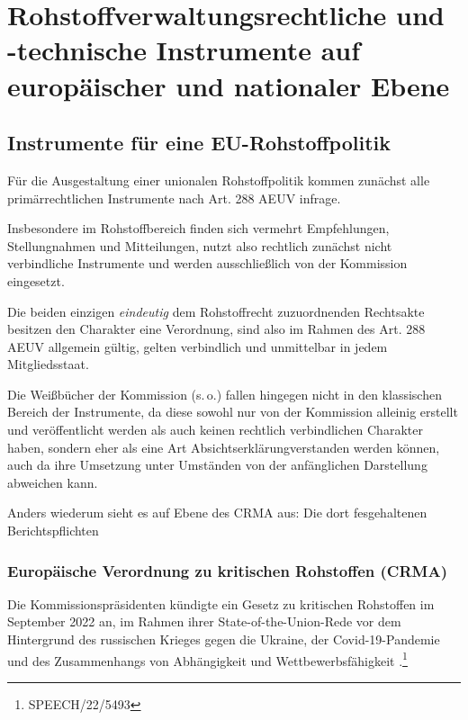 \documentclass[12pt,a4paper,oneside]{book} %
\begin{document}

\chapter{Rohstoffverwaltungsrechtliche und -technische Instrumente auf europäischer und nationaler Ebene}

\section{Instrumente für eine EU-Rohstoffpolitik}
Für die Ausgestaltung einer unionalen Rohstoffpolitik kommen zunächst alle primärrechtlichen Instrumente nach Art. 288 AEUV infrage.

Insbesondere im Rohstoffbereich finden sich vermehrt Empfehlungen, Stellungnahmen und Mitteilungen, nutzt also rechtlich zunächst nicht verbindliche Instrumente und werden ausschließlich von der Kommission eingesetzt.

Die beiden einzigen \textit{eindeutig} dem Rohstoffrecht zuzuordnenden Rechtsakte besitzen den Charakter eine Verordnung, sind also im Rahmen des Art. 288 AEUV allgemein gültig, gelten verbindlich und unmittelbar in jedem Mitgliedsstaat. 



Die Weißbücher der Kommission (s.\,o.) fallen hingegen nicht in den klassischen Bereich der Instrumente, da diese sowohl nur von der Kommission alleinig erstellt und veröffentlicht werden als auch keinen rechtlich verbindlichen Charakter haben, sondern eher als eine Art \glqq Absichtserklärung\grqq verstanden werden können, auch da ihre Umsetzung unter Umständen von der anfänglichen Darstellung abweichen kann.\autocite[siehe hierzu]{Dauses/Ludwigs, O. Umweltrecht, Rn. 196} 

Anders wiederum sieht es auf Ebene des CRMA aus: Die dort fesgehaltenen Berichtspflichten

\subsection{Europäische Verordnung zu kritischen Rohstoffen (CRMA)}%
Die Kommissionspräsidenten kündigte ein Gesetz zu kritischen Rohstoffen im September 2022 an, im Rahmen ihrer State-of-the-Union-Rede vor dem Hintergrund des russischen Krieges gegen die Ukraine, der Covid-19-Pandemie und des Zusammenhangs von Abhängigkeit und Wettbewerbsfähigkeit .\footnote{SPEECH/22/5493}
\end{document}

